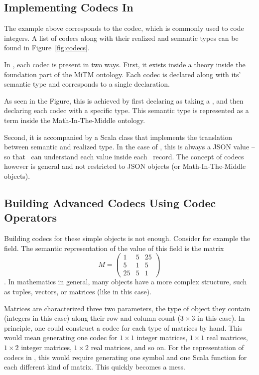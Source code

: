 \subsection{Implementing Codecs In \mmt}\label{sec:vt:mmt}

%
The example above corresponds to the  codec, which is commonly used to code integers. 
A list of codecs along with their realized and semantic types can be found in Figure~\ref{fig:codecs}. 

In \mmt, each codec is present in two ways.
First, it exists inside a  theory inside the foundation part of the MiTM ontology. 
Each codec is declared along with its' semantic type and corresponds to a single declaration. 

As seen in the Figure, this is achieved by first declaring  as taking a , and then declaring each codec with a specific type. 
This semantic type is represented as a term inside the Math-In-The-Middle ontology. 

Second, it is accompanied by a Scala class that implements the translation between semantic and realized type. 
In the case of \lmfdb, this is always a JSON value -- so that \mmt\ can understand each value inside each \lmfdb\ record. 
The concept of codecs however is general and not restricted to JSON objects (or Math-In-The-Middle objects). 

\subsection{Building Advanced Codecs Using Codec Operators}\label{sec:vt:operators}

Building codecs for these simple objects is not enough. 
Consider for example the  field. 
The semantic representation of the value of this field is the matrix $$M = \left( \begin{array}{ccc}
1 & 5 & 25 \\
5 & 1 & 5 \\
25 & 5 & 1 \end{array} \right) $$. 
In mathematics in general, many objects have a more complex structure, such as tuples, vectors, or matrices (like in this case). 

Matrices are characterized three two parameters, the type of object they contain (integers in this case) along their row and column count ($3 \times 3$ in this case). 
In principle, one could construct a codec for each type of matrices by hand. 
This would mean generating one codec for $1 \times 1$ integer matrices, $1 \times 1$ real matrices, $1 \times 2$ integer matrices, $1 \times  2$ real matrices, and so on. 
For the representation of codecs in \mmt, this would require generating one symbol and one Scala function for each different kind of matrix. 
This quickly becomes a mess. 

